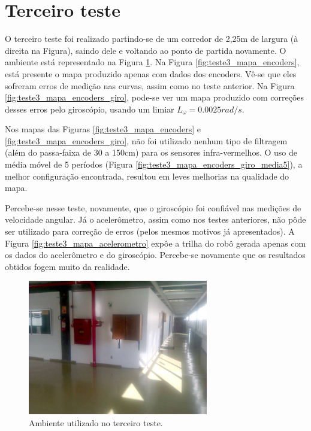 \section{Terceiro teste}

O terceiro teste foi realizado partindo-se de um corredor de 2,25m de largura (à direita na Figura), saindo dele e voltando ao ponto de partida novamente. O ambiente está representado na Figura \ref{fig:teste3_foto}. Na Figura \ref{fig:teste3_mapa_encoders}, está presente o mapa produzido apenas com dados dos encoders. Vê-se que eles sofreram erros de medição nas curvas, assim como no teste anterior. Na Figura \ref{fig:teste3_mapa_encoders_giro}, pode-se ver um mapa produzido com correções desses erros pelo giroscópio, usando um limiar $L_\omega = 0.0025 \unit{rad/s}$.

Nos mapas das Figuras \ref{fig:teste3_mapa_encoders} e \ref{fig:teste3_mapa_encoders_giro}, não foi utilizado nenhum tipo de filtragem (além do passa-faixa de 30 a 150cm) para os sensores infra-vermelhos. O uso de média móvel de 5 períodos (Figura \ref{fig:teste3_mapa_encoders_giro_media5}), a melhor configuração encontrada, resultou em leves melhorias na qualidade do mapa.

Percebe-se nesse teste, novamente, que o giroscópio foi confiável nas medições de velocidade angular. Já o acelerômetro, assim como nos testes anteriores, não pôde ser utilizado para correção de erros (pelos mesmos motivos já apresentados). A Figura \ref{fig:teste3_mapa_acelerometro} expôe a trilha do robô gerada apenas com os dados do acelerômetro e do giroscópio. Percebe-se novamente que os resultados obtidos fogem muito da realidade.

\begin{figure}[H]
	\centering
	\includegraphics[width=0.7\textwidth]{./figuras/testes/teste3/foto_ambiente.jpg}
	\caption{Ambiente utilizado no terceiro teste.}
	\label{fig:teste3_foto}
\end{figure}

